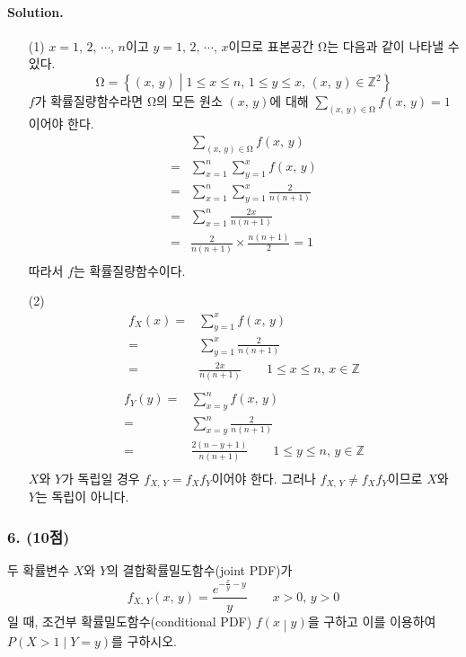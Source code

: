 \paragraph{Solution.} 
\begin{itemize}
	\item [(1)] {
		$x=1,\,2,\,\cdots,\,n$이고 $y=1,\,2,\,\cdots,\,x$이므로 표본공간 $\mathrm{\Omega}$는 다음과 같이 나타낼 수 있다.
		\[\mathrm{\Omega} = \left\{\left(x,\, y\right) \middle| 1 \leq x \leq n ,\, 1 \leq y \leq x,\, \left(x,\, y\right) \in \mathbb{Z}^2 \right\}\]
		$f$가 확률질량함수라면 $\mathrm{\Omega}$의 모든 원소 $\left(x,\, y\right)$에 대해 $\sum_{\left(x,\, y\right) \in \mathrm{\Omega}} f\left(x,\, y\right) = 1$이어야 한다.
		\begin{align*}
			& \sum_{\left(x,\, y\right) \in \mathrm{\Omega}} f\left(x,\, y\right) \\
			=& \sum_{x=1}^{n} \sum_{y=1}^{x} f\left(x,\, y\right) \\
			=& \sum_{x=1}^{n} \sum_{y=1}^{x} \frac{2}{n\left(n + 1\right)} \\
			=& \sum_{x=1}^{n} \frac{2x}{n\left(n + 1\right)} \\
			=& \frac{2}{n\left(n + 1\right)} \times \frac{n\left(n + 1\right)}{2} = 1 \\
		\end{align*}
		따라서 $f$는 확률질량함수이다.
	}
    \item [(2)] {
		\begin{align*}
			f_X\left(x\right) =& \sum_{y=1}^{x} f\left(x,\, y\right) \\
			=& \sum_{y=1}^{x} \frac{2}{n\left(n + 1\right)} \\
			=& \frac{2x}{n\left(n + 1\right)} \qquad 1 \leq x \leq n,\, x \in \mathbb{Z}\\
		\end{align*}
		\begin{align*}
			f_Y\left(y\right) =& \sum_{x=y}^{n} f\left(x,\, y\right) \\
			=& \sum_{x=y}^{n} \frac{2}{n\left(n + 1\right)} \\
			=& \frac{2\left(n - y + 1\right)}{n\left(n + 1\right)} \qquad 1 \leq y \leq n,\, y \in \mathbb{Z}\\
		\end{align*}
		$X$와 $Y$가 독립일 경우 $f_{X,\,Y} = f_X f_Y$이어야 한다. 그러나 $f_{X,\,Y} \neq f_X f_Y$이므로 $X$와 $Y$는 독립이 아니다.
	}
\end{itemize}

\subsubsection{6. (10점)} 두 확률변수 $X$와 $Y$의 결합확률밀도함수(joint PDF)가
\[f_{X,\,Y}\left(x,\,y\right) = \frac{e^{-\frac{x}{y} - y}}{y} \qquad x > 0,\,y > 0\]
일 때, 조건부 확률밀도함수(conditional PDF) $f\left(x\middle|y\right)$을 구하고 이를 이용하여 $P\left(X>1\middle|Y=y\right)$를 구하시오.

